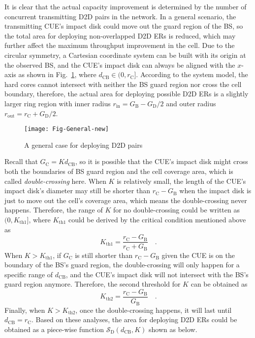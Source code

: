 \documentclass[journal, 10pt]{IEEEtran}
\begin{document}
It is clear that the actual capacity improvement is determined by the
number of concurrent transmitting D2D pairs in the network. In a
general scenario, the transmitting CUE's impact disk could move out
the guard region of the BS, so the total area for deploying
non-overlapped D2D ERs is reduced, which may further affect the
maximum throughput improvement in the cell. Due to the circular
symmetry, a Cartesian coordinate system can be built with its origin
at the observed BS, and the CUE's impact disk can always be aligned
with the $x$-axis as shown in Fig.~\ref{fig:general}, where
$d_\mathrm{CB} \in (0, r_\mathrm{C}]$. 
According to the system model, the hard cores cannot intersect with
neither the BS guard region nor cross the cell boundary, therefore,
the actual area for deploying possible D2D ERs is a slightly larger
ring region with inner radius $r_\mathrm{in} = G_\mathrm{B} -
G_\mathrm{D}/{2}$ and outer radius $r _\mathrm{out} = r_\mathrm{C} +
G_\mathrm{D}/{2}$.
\begin{figure}[!htb]
\centering \texttt{[image: Fig-General-new]} \caption{A general case for deploying D2D pairs} \label{fig:general} 
\end{figure}
 

Recall that $G_\mathrm{C} = K d_\mathrm{CB} $, so it is possible that
the CUE's impact disk might cross both the boundaries of BS guard
region and the cell coverage area, which is called
\emph{double-crossing} here. 
When $K$ is relatively small, the length of the CUE's impact disk's
diameter may still be shorter than $r_\mathrm{C} - G_\mathrm{B}$ when
the impact disk is just to move out the cell's coverage area, which
means the double-crossing never happens. Therefore, the range of $K$
for no double-crossing could be written as $(0, K_\mathrm{th1}]$, where
$K_\mathrm{th1}$ could be derived by the critical condition mentioned
above as 
\begin{equation}
K_\mathrm{th1} = \frac{r_\mathrm{C} - G_\mathrm{B}}{r_\mathrm{C} + G_\mathrm{B}}\quad.
\end{equation}
When $K > K_\mathrm{th1}$, if $G_\mathrm{C}$ is still shorter than 
$r_\mathrm{C} - G_\mathrm{B}$ given the CUE is on the boundary of the BS's 
guard region, the double-crossing will only happen for a specific range of 
$d_\mathrm{CB}$, and the CUE's impact disk will not intersect with the BS's 
guard region anymore. Therefore, the second threshold for $K$ can be obtained as
\begin{equation}
K_\mathrm{th2} = \frac{r_\mathrm{C} - G_\mathrm{B}}{ G_\mathrm{B}}\quad.
\end{equation}
Finally, when $K > K_\mathrm{th2}$,  once the double-crossing happens, it 
will last until $d_\mathrm{CB}= r_\mathrm{C}$. Based on these analyses, the 
area for deploying D2D ERs could be obtained as a piece-wise function 
$\mathcal{S}_{\mathrm{D}}\left(d_\mathrm{CB}, K\right)$ shown as below. 
\end{document}
